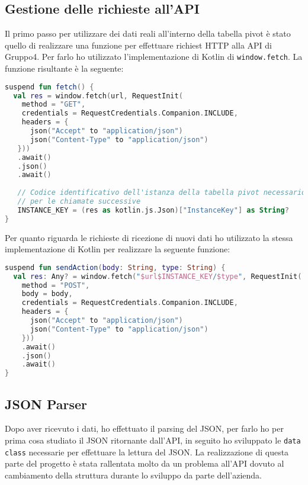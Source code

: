 \subsection{Gestione delle richieste all'API}
Il primo passo per utilizzare dei dati reali all'interno della tabella pivot è stato quello di realizzare una funzione per effettuare richiest HTTP alla API di Gruppo4. Per farlo ho utilizzato l'implementazione di Kotlin di \verb|window.fetch|. La funzione risultante è la seguente:
\begin{lstlisting}[caption={BodyCells}, label={lst:bodycells}, language=Kotlin]
suspend fun fetch() {
  val res = window.fetch(url, RequestInit(
    method = "GET",
    credentials = RequestCredentials.Companion.INCLUDE,
    headers = {
      json("Accept" to "application/json")
      json("Content-Type" to "application/json")
   }))
   .await()
   .json()
   .await()
   
   // Codice identificativo dell'istanza della tabella pivot necessario
   // per le chiamate successive
   INSTANCE_KEY = (res as kotlin.js.Json)["InstanceKey"] as String?
}
\end{lstlisting}
Per quanto riguarda le richieste di ricezione di nuovi dati ho utilizzato la stessa implementazione di Kotlin per realizzare la seguente funzione:
\begin{lstlisting}[caption={BodyCells}, label={lst:bodycells}, language=Kotlin]
suspend fun sendAction(body: String, type: String) {
  val res: Any? = window.fetch("$url$INSTANCE_KEY/$type", RequestInit(
    method = "POST",
    body = body,
    credentials = RequestCredentials.Companion.INCLUDE,
    headers = {
      json("Accept" to "application/json")
      json("Content-Type" to "application/json")
    }))
    .await()
    .json()
    .await()
}
\end{lstlisting}
\subsection{JSON Parser}
Dopo aver ricevuto i dati, ho effettuato il parsing del JSON, per farlo ho per prima cosa studiato il JSON ritornante dall'API, in seguito ho sviluppato le \verb|data class| necessarie per effettuare la lettura del JSON. La realizzazione di questa parte del progetto è stata rallentata molto da un problema all'API dovuto al cambiamento della struttura durante lo sviluppo da parte dell'azienda.  
